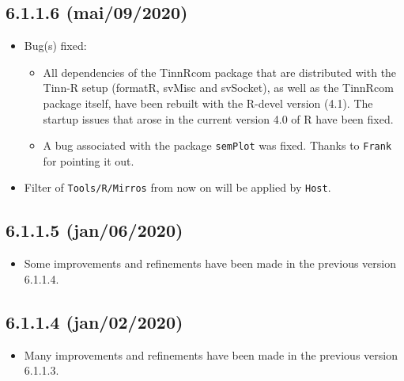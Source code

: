 \subsection*{6.1.1.6 (mai/09/2020)}
\begin{itemize}
  \item Bug(s) fixed:
    \begin{itemize}
      \item All dependencies of the TinnRcom package that are distributed with the Tinn-R setup
        (formatR, svMisc and svSocket), as well as the TinnRcom package itself, have been rebuilt
        with the R-devel version (4.1). The startup issues that arose in the current version 4.0 of
        R have been fixed.
      \item A bug associated with the package \texttt{semPlot} was fixed.
        Thanks to \texttt{Frank} for pointing it out.
    \end{itemize}
  \item Filter of \texttt{Tools/R/Mirros} from now on will be applied by \texttt{Host}.
\end{itemize}

\subsection*{6.1.1.5 (jan/06/2020)}
\begin{itemize}
  \item Some improvements and refinements have been made in the previous version 6.1.1.4.
\end{itemize}

\subsection*{6.1.1.4 (jan/02/2020)}
\begin{itemize}
  \item Many improvements and refinements have been made in the previous version 6.1.1.3.
\end{itemize}

